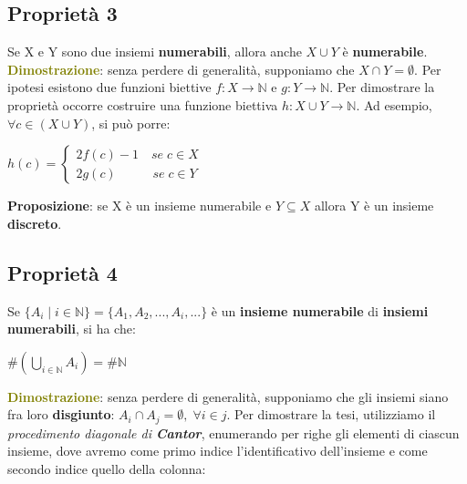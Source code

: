 \subsection{Proprietà 3}
Se X e Y sono due insiemi \textbf{numerabili}, allora anche $X \cup Y$ è \textbf{numerabile}. \\
\textcolor{olive}{\textbf{Dimostrazione}}: senza perdere di generalità, supponiamo che $X \cap Y = \emptyset$. Per ipotesi esistono due funzioni biettive $f : X \rightarrow \mathbb{N}$ e $g : Y \rightarrow \mathbb{N}$. Per dimostrare la proprietà occorre costruire una funzione biettiva $h : X \cup Y \rightarrow \mathbb{N}$. Ad esempio, $\forall c \in (X \cup Y)$, si può porre:
\begin{center}
    \begin{math}
        h(c) = 
        \begin{cases}
            2f(c) - 1 \quad se \; c \in X \\
            2g(c) \;\;\; \qquad se \; c \in Y
        \end{cases}
    \end{math}
\end{center}

\textbf{Proposizione}: se X è un insieme numerabile e $Y \subseteq X$ allora Y è un insieme \textbf{discreto}.

\subsection{Proprietà 4}
Se $\{A_i \; | \; i \in \mathbb{N}\} = \{A_1, A_2, ..., A_i, ...\}$ è un \textbf{insieme numerabile} di \textbf{insiemi numerabili}, si ha che:
\begin{center}
    $\#(\bigcup_{i \in \mathbb{N}}A_i) = \#\mathbb{N}$
\end{center}
\textcolor{olive}{\textbf{Dimostrazione}}: senza perdere di generalità, supponiamo che gli insiemi siano fra loro \textbf{disgiunto}: $A_i \cap A_j = \emptyset, \; \forall i \in j$. Per dimostrare la tesi, utilizziamo il \textit{procedimento diagonale di \textbf{Cantor}}, enumerando per righe gli elementi di ciascun insieme, dove avremo come primo indice l'identificativo dell'insieme e come secondo indice quello della colonna:

